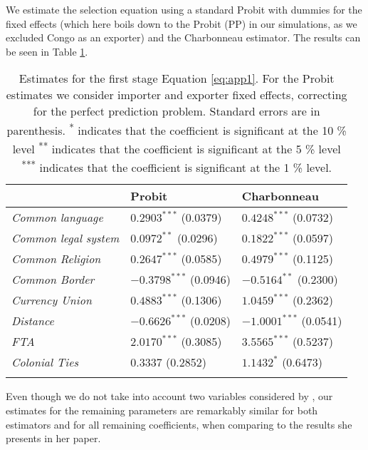 We estimate the selection equation using a standard Probit with dummies for the fixed effects (which here boils down to the Probit (PP) in our simulations, as we excluded Congo as an exporter) and the Charbonneau estimator. The results can be seen in Table \ref{tab:app1}.
\begin{table}
    \small
    \centering
    \begin{tabular}{p{5cm}p{2cm}p{2cm}}
      \hline
       \quad & Probit  & Charbonneau \\
       \hline
        \textit{Common language}  &  $0.2903^{***}$ (0.0379) &  $0.4248^{***}$ (0.0732) \\
        \textit{Common legal system}  &  $0.0972^{**}$ (0.0296) &  $0.1822^{***}$ (0.0597)\\
        \textit{Common Religion} & $0.2647^{***}$ (0.0585)&  $0.4979^{***}$ (0.1125)\\
        \textit{Common Border} & $-0.3798^{***}$ (0.0946) &  $-0.5164^{**}$ (0.2300)\\
        \textit{Currency Union} &  $0.4883^{***}$ (0.1306) &  $1.0459^{***}$ (0.2362)\\
        \textit{Distance}  & $-0.6626^{***}$ (0.0208) &  $-1.0001^{***}$ (0.0541)\\
        \textit{FTA} &  $2.0170^{***}$ (0.3085) & $3.5565^{***}$ (0.5237)\\
        \textit{Colonial Ties} &  $0.3337$ (0.2852) &  $1.1432^{*}$ (0.6473)\\
         & &  \\
        \hline
    \end{tabular}
    \caption{\footnotesize{Estimates for the first stage Equation \ref{eq:app1}. For the Probit estimates we consider importer and exporter fixed effects, correcting for the perfect prediction problem. Standard errors are in parenthesis. \newline \textsuperscript{*} indicates that the coefficient is significant at the 10 \% level \newline \textsuperscript{**} indicates that the coefficient is significant at the 5 \% level \newline \textsuperscript{***} indicates that the coefficient is significant at the 1 \% level.}}
    \label{tab:app1}
\end{table}

Even though we do not take into account two variables considered by \cite{charbonneau2017multiple}, our estimates for the remaining parameters are remarkably similar for both estimators and for all remaining coefficients, when comparing to the results she presents in her paper.

